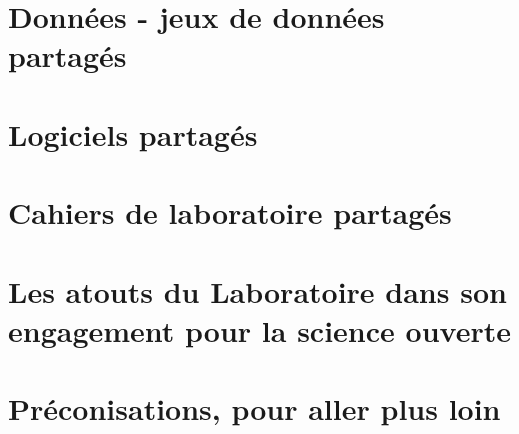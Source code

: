 \documentclass[french, 11pt]{../../dibiso/biso}
\begin{document}






\pagebreak

\section{Données - jeux de données partagés}







\section{Logiciels partagés}







\section{Cahiers de laboratoire partagés}







\pagebreak

\section{Les atouts du Laboratoire dans son engagement pour la science ouverte}








\section{Préconisations, pour aller plus loin}
\end{document}
